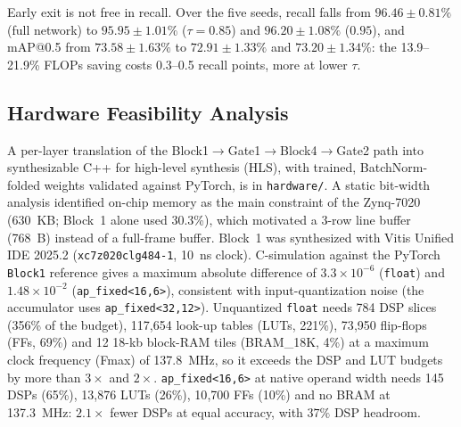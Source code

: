 \documentclass[pdflatex,sn-mathphys-num,iicol]{sn-jnl}%
\begin{document}
\begin{table}[t]
\centering
\caption{Early-exit threshold $\tau$ vs.\ recall and compute, EMA-Det (final), test set; checkpoint with the best validation mAP@0.5 (five-seed means in the text). FPS: batch 1, RTX~4060 laptop GPU (proxy, not the FPGA).}\label{tab:earlyexit}
\tablebodyfont
{}
\end{table}

Early exit is not free in recall. Over the five seeds, recall falls from
$96.46\pm0.81\%$ (full network) to $95.95\pm1.01\%$ ($\tau{=}0.85$) and
$96.20\pm1.08\%$ ($0.95$), and mAP@0.5 from $73.58\pm1.63\%$ to $72.91\pm1.33\%$ and
$73.20\pm1.34\%$: the 13.9--21.9\% FLOPs saving costs 0.3--0.5 recall points, more at
lower $\tau$.

\subsection{Hardware Feasibility Analysis}\label{sec:hardware}

A per-layer translation of the Block1$\to$Gate1$\to$Block4$\to$Gate2 path
into synthesizable C++ for high-level synthesis (HLS), with trained,
BatchNorm-folded weights validated against PyTorch, is in
\texttt{hardware/}. A static bit-width analysis identified on-chip memory as the main
constraint of the Zynq-7020 (630~KB; Block~1 alone used 30.3\%), which
motivated a 3-row line buffer (768~B) instead of a full-frame buffer. Block~1 was synthesized with Vitis Unified IDE 2025.2
(\texttt{xc7z020clg484-1}, 10~ns clock). C-simulation against the PyTorch
\texttt{Block1} reference gives a maximum absolute difference of
$3.3\times10^{-6}$ (\texttt{float}) and $1.48\times10^{-2}$
(\texttt{ap\_fixed<16,6>}), consistent with input-quantization noise (the
accumulator uses \texttt{ap\_fixed<32,12>}). Unquantized \texttt{float} needs 784 DSP slices (356\% of the budget), 117{,}654
look-up tables (LUTs, 221\%), 73{,}950 flip-flops (FFs, 69\%) and 12 18-kb
block-RAM tiles (BRAM\_18K, 4\%) at a maximum clock frequency (Fmax) of
137.8~MHz, so it exceeds the DSP and LUT budgets by more than $3\times$ and
$2\times$. \texttt{ap\_fixed<16,6>} at native operand width needs 145 DSPs
(65\%), 13{,}876 LUTs (26\%), 10{,}700 FFs (10\%) and no BRAM at 137.3~MHz:
$2.1\times$ fewer DSPs at equal accuracy, with $37\%$ DSP headroom.
\end{document}
